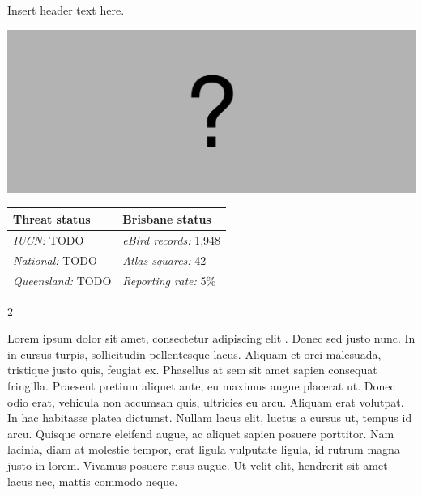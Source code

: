 \documentclass[12pt,openany,oneside]{book}
\let\origfigure\figure
\let\endorigfigure\endfigure
\renewenvironment{figure}[1][2] {
  \expandafter\origfigure\expandafter[H]
} {
  \endorigfigure
}
\let\Begin\begin
\let\End\end
\theoremstyle{definition}
\theoremstyle{definition}
\theoremstyle{definition}
\theoremstyle{remark}
\begin{document}

Insert header text here.

\begin{figure}
\centering
\includegraphics[width=\textwidth,keepaspectratio=true]{assets/misc/missing-profile.png}
\caption{Insert caption here.}
\end{figure}

\begin{tabu} to 
\toprule
Threat status & Brisbane status\\
\midrule
\textit{IUCN:} TODO & \textit{eBird records:} 1,948\\
\textit{National:} TODO & \textit{Atlas squares:} 42\\
\textit{Queensland:} TODO & \textit{Reporting rate:} 5\%\\
\bottomrule
\end{tabu} 
\vspace{0.15cm}

\Begin{multicols}{2}

Lorem ipsum dolor sit amet, consectetur adipiscing elit
\citep{rexample1, rexample2, rexample3}. Donec sed justo nunc. In in
cursus turpis, sollicitudin pellentesque lacus. Aliquam et orci
malesuada, tristique justo quis, feugiat ex. Phasellus at sem sit amet
sapien consequat fringilla. Praesent pretium aliquet ante, eu maximus
augue placerat ut. Donec odio erat, vehicula non accumsan quis,
ultricies eu arcu. Aliquam erat volutpat. In hac habitasse platea
dictumst. Nullam lacus elit, luctus a cursus ut, tempus id arcu. Quisque
ornare eleifend augue, ac aliquet sapien posuere porttitor. Nam lacinia,
diam at molestie tempor, erat ligula vulputate ligula, id rutrum magna
justo in lorem. Vivamus posuere risus augue. Ut velit elit, hendrerit
sit amet lacus nec, mattis commodo neque.

\End{multicols}

\clearpage
\end{document}
